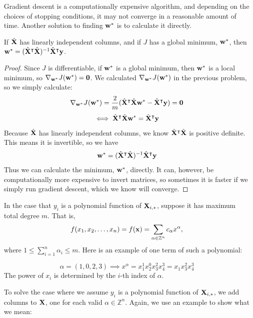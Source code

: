 Gradient descent is a computationally expensive algorithm, and depending on the choices of stopping conditions, it may not converge in a reasonable amount of time. Another solution to finding $\vw^\ast$ is to calculate it directly.
\begin{proposition}
If $\hat{\MX}$ has linearly independent columns, and if $J$ has a global minimum, $\vw^\ast$, then $\vw^\ast = (\hat{\MX} ^\intercal \hat{\MX})^{-1} \hat{\MX}^\intercal \vy$.
\begin{proof}
Since $J$ is differentiable, if $\vw^\ast$ is a global minimum, then $\vw^\ast$ is a local minimum, so $\nabla_{\vw^\ast} J(\vw^\ast) = \vzero $. We calculated $\nabla_{\vw^\ast} J(\vw^\ast)$ in the previous problem, so we simply calculate:
$$ \nabla_{\vw^\ast} J(\vw^\ast) = \frac{2}{m} (\hat{\MX} ^\intercal \hat{\MX} \vw^\ast - \hat{\MX}^\intercal \vy) = \vzero$$
$$ \iff \hat{\MX} ^\intercal \hat{\MX} \vw^\ast = \hat{\MX}^\intercal \vy$$
Because $\hat{\MX}$ has linearly independent columns, we know $\hat{\MX} ^\intercal \hat{\MX}$ is positive definite. This means it is invertible, so we have
$$ \vw^\ast = (\hat{\MX} ^\intercal \hat{\MX})^{-1} \hat{\MX}^\intercal \vy $$
Thus we can calculate the minimum, $\vw^\ast$, directly. It can, however, be computationally more expensive to invert matrices, so sometimes it is faster if we simply run gradient descent, which we know will converge.
\end{proof}
\end{proposition}

In the case that $y_i$ is a polynomial function of $\MX_{i,\ast}$, suppose it has maximum total degree $m$. That is, 
$$f(x_1, x_2, \ldots, x_n) = f(\vx) = \sum \limits_{\alpha \in \mathbb{Z}^n} c_\alpha x^\alpha,$$
where $1 \leq \sum \limits_{i=1}^{n} \alpha_i \leq m$. Here is an example of one term of such a polynomial:

\begin{example}
$$ \alpha = (1, 0, 2, 3) \implies x^\alpha = x_1^1 x_2^0 x_3^2 x_4^3 = x_1 x_3^2 x_4^3 $$
The power of $x_i$ is determined by the $i$-th index of $\alpha$.
\end{example}

To solve the case where we assume $y_i$ is a polynomial function of $\MX_{i,\ast}$, we add columns to $\MX$, one for each valid $\alpha \in \mathbb{Z}^n$. Again, we use an example to show what we mean:

